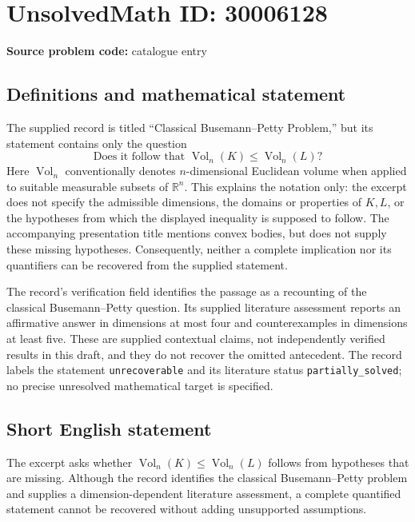 \documentclass[11pt]{article}
\newcommand{\R}{\mathbb{R}}
\begin{document}
\section*{UnsolvedMath ID: 30006128}
\textbf{Source problem code:} catalogue entry
\subsection{Definitions and mathematical statement}
The supplied record is titled ``Classical Busemann--Petty Problem,'' but its statement contains only the question
\[
\text{Does it follow that }\operatorname{Vol}_n(K)\leq\operatorname{Vol}_n(L)\text{?}
\]
Here \(\operatorname{Vol}_n\) conventionally denotes \(n\)-dimensional Euclidean volume when applied to suitable measurable subsets of \(\R^n\). This explains the notation only: the excerpt does not specify the admissible dimensions, the domains or properties of \(K,L\), or the hypotheses from which the displayed inequality is supposed to follow. The accompanying presentation title mentions convex bodies, but does not supply these missing hypotheses. Consequently, neither a complete implication nor its quantifiers can be recovered from the supplied statement.

The record's verification field identifies the passage as a recounting of the classical Busemann--Petty question. Its supplied literature assessment reports an affirmative answer in dimensions at most four and counterexamples in dimensions at least five. These are supplied contextual claims, not independently verified results in this draft, and they do not recover the omitted antecedent. The record labels the statement \texttt{unrecoverable} and its literature status \texttt{partially\_solved}; no precise unresolved mathematical target is specified.
\subsection{Short English statement}
The excerpt asks whether \(\operatorname{Vol}_n(K)\leq\operatorname{Vol}_n(L)\) follows from hypotheses that are missing. Although the record identifies the classical Busemann--Petty problem and supplies a dimension-dependent literature assessment, a complete quantified statement cannot be recovered without adding unsupported assumptions.
\end{document}
